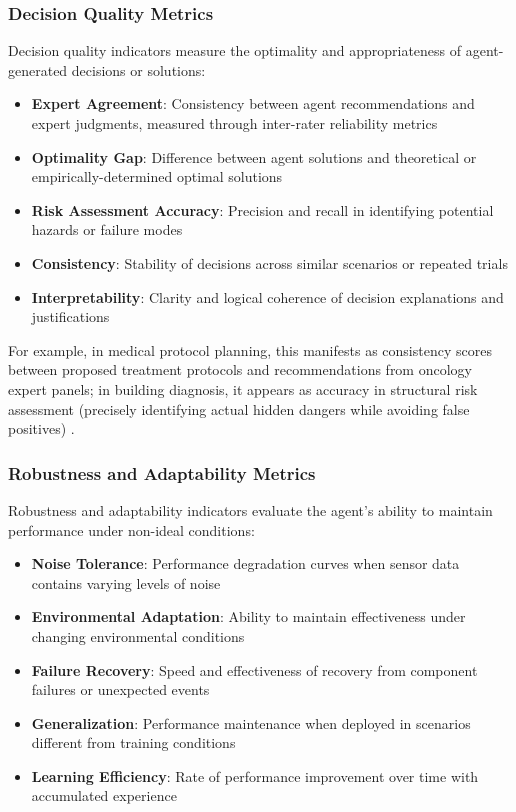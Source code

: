 \subsubsection{Decision Quality Metrics}

Decision quality indicators measure the optimality and appropriateness of agent-generated decisions or solutions:

\begin{itemize}
\item \textbf{Expert Agreement}: Consistency between agent recommendations and expert judgments, measured through inter-rater reliability metrics
\item \textbf{Optimality Gap}: Difference between agent solutions and theoretical or empirically-determined optimal solutions
\item \textbf{Risk Assessment Accuracy}: Precision and recall in identifying potential hazards or failure modes
\item \textbf{Consistency}: Stability of decisions across similar scenarios or repeated trials
\item \textbf{Interpretability}: Clarity and logical coherence of decision explanations and justifications
\end{itemize}

For example, in medical protocol planning, this manifests as consistency scores between proposed treatment protocols and recommendations from oncology expert panels; in building diagnosis, it appears as accuracy in structural risk assessment (precisely identifying actual hidden dangers while avoiding false positives) \cite{rasheed2020digital}.

\subsubsection{Robustness and Adaptability Metrics}

Robustness and adaptability indicators evaluate the agent's ability to maintain performance under non-ideal conditions:

\begin{itemize}
\item \textbf{Noise Tolerance}: Performance degradation curves when sensor data contains varying levels of noise
\item \textbf{Environmental Adaptation}: Ability to maintain effectiveness under changing environmental conditions
\item \textbf{Failure Recovery}: Speed and effectiveness of recovery from component failures or unexpected events
\item \textbf{Generalization}: Performance maintenance when deployed in scenarios different from training conditions
\item \textbf{Learning Efficiency}: Rate of performance improvement over time with accumulated experience
\end{itemize}

